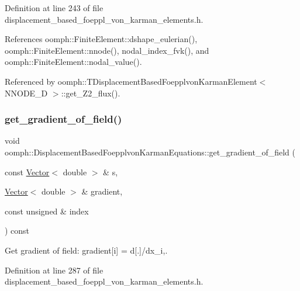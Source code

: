 Definition at line 243 of file displacement\+\_\+based\+\_\+foeppl\+\_\+von\+\_\+karman\+\_\+elements.\+h.



References oomph\+::\+Finite\+Element\+::dshape\+\_\+eulerian(), oomph\+::\+Finite\+Element\+::nnode(), nodal\+\_\+index\+\_\+fvk(), and oomph\+::\+Finite\+Element\+::nodal\+\_\+value().



Referenced by oomph\+::\+T\+Displacement\+Based\+Foepplvon\+Karman\+Element$<$ N\+N\+O\+D\+E\+\_\+D $>$\+::get\+\_\+\+Z2\+\_\+flux().

\mbox{\label{classoomph_1_1DisplacementBasedFoepplvonKarmanEquations_a7f0e08691ebe9a34bfd95d6f2c38558f}} 
\subsubsection{\texorpdfstring{get\+\_\+gradient\+\_\+of\+\_\+field()}{get\_gradient\_of\_field()}}
{\footnotesize\ttfamily void oomph\+::\+Displacement\+Based\+Foepplvon\+Karman\+Equations\+::get\+\_\+gradient\+\_\+of\+\_\+field (\begin{DoxyParamCaption}\item[{const \hyperlink{classoomph_1_1Vector}{Vector}$<$ double $>$ \&}]{s,  }\item[{\hyperlink{classoomph_1_1Vector}{Vector}$<$ double $>$ \&}]{gradient,  }\item[{const unsigned \&}]{index }\end{DoxyParamCaption}) const\hspace{0.3cm}{\ttfamily [inline]}}



Get gradient of field\+: gradient\mbox{[}i\mbox{]} = d\mbox{[}.\mbox{]}/dx\+\_\+i,. 



Definition at line 287 of file displacement\+\_\+based\+\_\+foeppl\+\_\+von\+\_\+karman\+\_\+elements.\+h.



